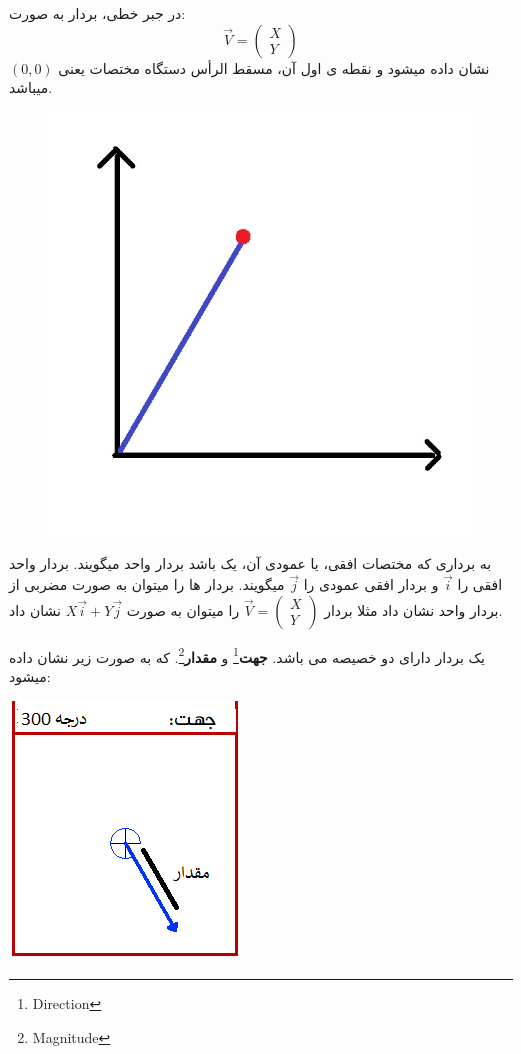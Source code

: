 \documentclass[14pt,a4paper]{memoir}
\begin{document}
	 در جبر خطی، بردار  به صورت:	 
	 \[\vec{V} = \begin{pmatrix}
	 X \\ Y
	 \end{pmatrix}
	 \] 	 
	 نشان داده میشود و نقطه ی اول آن، مسقط الرأس دستگاه مختصات یعنی $ (0, 0) $ میباشد. 	 
\begin{figure}[H]
	\centering
		\includegraphics[scale=0.8]{LinAlgVec}
	
\end{figure}
		به برداری که مختصات افقی، یا عمودی آن، یک باشد بردار واحد میگویند. بردار واحد افقی را $ \vec{i} $ و بردار افقی عمودی را $ \vec{j} $ میگویند. بردار ها را میتوان به صورت مضربی از بردار واحد نشان داد مثلا بردار $ \vec{V} = \begin{pmatrix}
	X \\ Y
	\end{pmatrix}$ را میتوان به صورت $ X\vec{i} + Y\vec{j} $ نشان داد. 
	
	
	
	
یک بردار دارای دو خصیصه می باشد. \textbf{جهت}\footnote{Direction} و \textbf{مقدار}\footnote{Magnitude}. که به صورت زیر نشان داده میشود:

	
		 \begin{center}
		\includegraphics[scale=1]{DirMag}
	\end{center}
\end{document}
